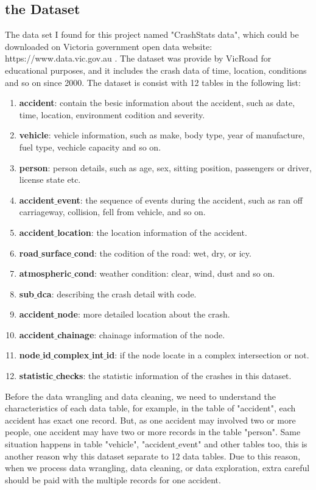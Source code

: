\documentclass[11pt]{article}
\theoremstyle{definition}
\begin{document}
\subsection{the Dataset}
The data set I found for this project named "CrashStats data", which could be downloaded on Victoria government open data website: https://www.data.vic.gov.au . The dataset was provide by VicRoad for educational purposes, and it includes the crash data of time, location, conditions and so on since 2000. The dataset is consist with 12 tables in the following list:
\begin{enumerate}
	\item \textbf{accident}:	contain the besic information about the accident, such as date, time, location, environment codition and severity.
	\item \textbf{vehicle}:	vehicle information, such as make, body type, year of manufacture, fuel type, vechicle capacity and so on.
	\item \textbf{person}:	person details, such as age, sex, sitting position, passengers or driver, license state etc.	
	\item \textbf{accident$\_$event}: the sequence of events during the accident, such as ran off carriageway, collision, fell from vehicle, and so on.
	\item \textbf{accident$\_$location}:	the location information of the accident.
	\item \textbf{road$\_$surface$\_$cond}:	the codition of the road: wet, dry, or icy.
	\item \textbf{atmospheric$\_$cond}:	weather condition: clear, wind, dust and so on.
	\item \textbf{sub$\_$dca}:	describing the crash detail with code.
	\item \textbf{accident$\_$node}:	more detailed location about the crash.
	\item \textbf{accident$\_$chainage}:	chainage information of the node.
	\item \textbf{node$\_$id$\_$complex$\_$int$\_$id}:	if the node locate in a complex intersection or not.
	\item \textbf{statistic$\_$checks}:	the statistic information of the crashes in this dataset.
\end{enumerate}
Before the data wrangling and data cleaning, we need to understand the characteristics of each data table, for example, in the table of "accident", each accident has exact one record. But, as one accident may involved two or more people, one accident may have two or more records in the table "person". Same situation happens in table "vehicle", "accident$\_$event" and other tables too, this is another reason why this dataset separate to 12 data tables. Due to this reason, when we process data wrangling, data cleaning, or data exploration, extra careful should be paid with the multiple records for one accident. 
\end{document}
